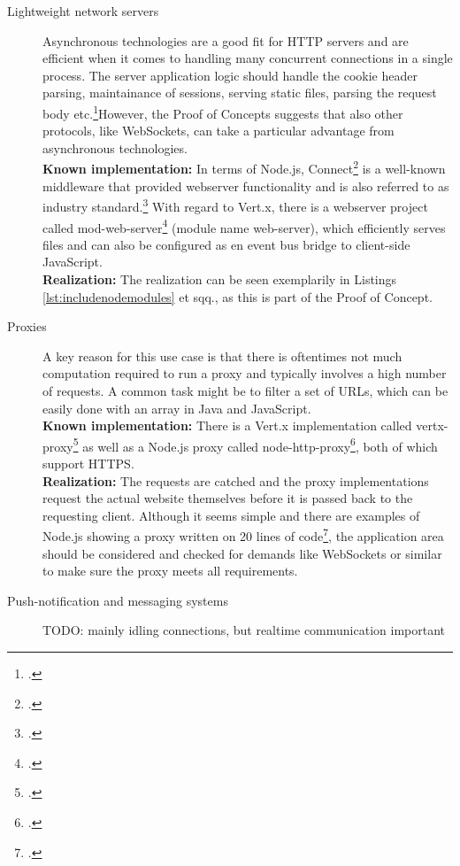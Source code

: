 \begin{description}
  
  \item[Lightweight network servers] Asynchronous technologies are a good fit for HTTP servers and are efficient when it comes to handling many concurrent connections in a single process. The server application logic should handle the cookie header parsing, maintainance of sessions, serving static files, parsing the request body etc.\footcite[Cf.][197 et seq,]{teixeira_2012}However, the Proof of Concepts suggests that also other protocols, like WebSockets, can take a particular advantage from asynchronous technologies.\\
\textbf{Known implementation:} In terms of Node.js, Connect\footcite[Cf.][]{Connect_2013} is a well-known middleware that provided webserver functionality and is also referred to as industry standard.\footcite[Cf.][145]{Roden_2012} With regard to Vert.x, there is a webserver project called mod-web-server\footcite[Cf.][]{vertxmodwebserver_2013} (module name web-server), which efficiently serves files and can also be configured as en event bus bridge to client-side JavaScript.\\
\textbf{Realization:} The realization can be seen exemplarily in Listings \ref{lst:includenodemodules} et sqq., as this is part of the Proof of Concept.
  \item[Proxies] A key reason for this use case is that there is oftentimes not much computation required to run a proxy and typically involves a high number of requests. A common task might be to filter a set of URLs, which can be easily done with an array in Java and JavaScript.\\
\textbf{Known implementation:} There is a Vert.x implementation called vertx-proxy\footcite[Cf.][]{vertxproxy} as well as a Node.js proxy called node-http-proxy\footcite[Cf.][]{nodeproxy}, both of which support HTTPS.\\
\textbf{Realization:} The requests are catched and the proxy implementations request the actual website themselves before it is passed back to the requesting client. Although it seems simple and there are examples of Node.js showing a proxy written on 20 lines of code\footcite[Cf.][]{krumins_nodeproxy}, the application area should be considered and checked for demands like WebSockets or similar to make sure the proxy meets all requirements.
  \item[Push-notification and messaging systems] TODO: mainly idling connections, but realtime communication important

\end{description}

